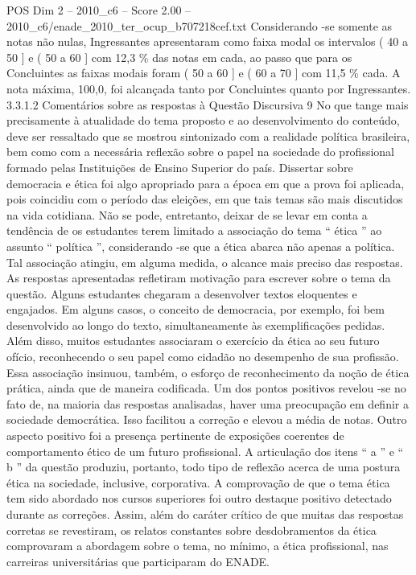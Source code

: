 \begin{textsample}{POS Dim 2 – 2010\_c6 – Score 2.00 – 2010\_c6/enade\_2010\_ter\_ocup\_b707218cef.txt}
Considerando -se somente as notas não nulas, Ingressantes apresentaram como faixa modal os intervalos ( 40 a 50 ] e ( 50 a 60 ] com 12,3 \% das notas em cada, ao passo que para os Concluintes as faixas modais foram ( 50 a 60 ] e ( 60 a 70 ] com 11,5 \% cada.
A nota máxima, 100,0, foi alcançada tanto por Concluintes quanto por Ingressantes. 3.3.1.2 Comentários sobre as respostas à Questão Discursiva 9 No que tange mais precisamente à atualidade do tema proposto e ao desenvolvimento do conteúdo, deve ser ressaltado que se mostrou sintonizado com a realidade política brasileira, bem como com a necessária reflexão sobre o papel na sociedade do profissional formado pelas Instituições de Ensino Superior do país.
Dissertar sobre democracia e ética foi algo apropriado para a época em que a prova foi aplicada, pois coincidiu com o período das eleições, em que tais temas são mais discutidos na vida cotidiana.
Não se pode, entretanto, deixar de se levar em conta a tendência de os estudantes terem limitado a associação do tema “ ética ” ao assunto “ política ”, considerando -se que a ética abarca não apenas a política.
Tal associação atingiu, em alguma medida, o alcance mais preciso das respostas.
As respostas apresentadas refletiram motivação para escrever sobre o tema da questão.
Alguns estudantes chegaram a desenvolver textos eloquentes e engajados.
Em alguns casos, o conceito de democracia, por exemplo, foi bem desenvolvido ao longo do texto, simultaneamente às exemplificações pedidas.
Além disso, muitos estudantes associaram o exercício da ética ao seu futuro ofício, reconhecendo o seu papel como cidadão no desempenho de sua profissão.
Essa associação insinuou, também, o esforço de reconhecimento da noção de ética prática, ainda que de maneira codificada.
Um dos pontos positivos revelou -se no fato de, na maioria das respostas analisadas, haver uma preocupação em definir a sociedade democrática.
Isso facilitou a correção e elevou a média de notas.
Outro aspecto positivo foi a presença pertinente de exposições coerentes de comportamento ético de um futuro profissional.
A articulação dos itens “ a ” e “ b ” da questão produziu, portanto, todo tipo de reflexão acerca de uma postura ética na sociedade, inclusive, corporativa.
A comprovação de que o tema ética tem sido abordado nos cursos superiores foi outro destaque positivo detectado durante as correções.
Assim, além do caráter crítico de que muitas das respostas corretas se revestiram, os relatos constantes sobre desdobramentos da ética comprovaram a abordagem sobre o tema, no mínimo, a ética profissional, nas carreiras universitárias que participaram do ENADE.

\end{textsample}
